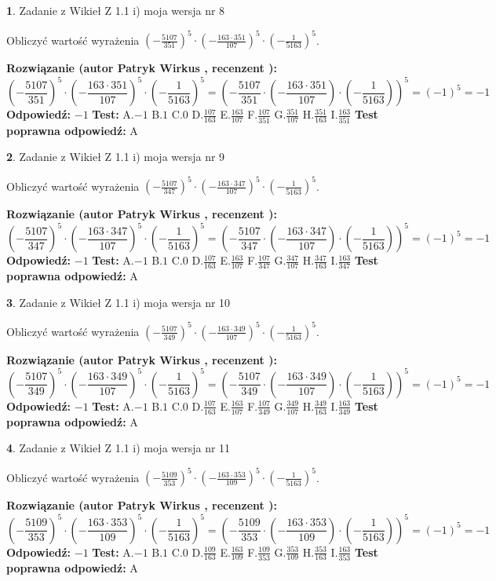 \documentclass[12pt, a4paper]{article}
\theoremstyle{definition} %
\newtheorem{zad}{}
\newcommand{\zadStart}[1]{\begin{zad}#1\newline}
\newcommand{\zadStop}{\end{zad}}
\newcommand{\rozwStart}[2]{\noindent \textbf{Rozwiązanie (autor #1 , recenzent #2): }\newline}
\newcommand{\rozwStop}{\newline}
\newcommand{\odpStart}{\noindent \textbf{Odpowiedź:}\newline}
\newcommand{\odpStop}{\newline}
\newcommand{\testStart}{\noindent \textbf{Test:}\newline}
\newcommand{\testStop}{\newline}
\newcommand{\kluczStart}{\noindent \textbf{Test poprawna odpowiedź:}\newline}
\newcommand{\kluczStop}{\newline}
\begin{document}
\zadStart{Zadanie z Wikieł Z 1.1 i) moja wersja nr 8}

Obliczyć wartość wyrażenia $(-\frac{5107}{351})^{5} \cdot (-\frac{163 \cdot 351}{107})^{5} \cdot (-\frac{1}{5163})^{5}$.
\zadStop
\rozwStart{Patryk Wirkus}{}
$$(-\frac{5107}{351})^{5} \cdot (-\frac{163 \cdot 351}{107})^{5} \cdot (-\frac{1}{5163})^{5} = (-\frac{5107}{351} \cdot (-\frac{163 \cdot 351}{107}) \cdot (-\frac{1}{5163}))^{5} = (-1)^{5} = -1$$
\rozwStop
\odpStart
$-1$
\odpStop
\testStart
A.$-1$ B.$1$ C.$0$ D.$\frac{107}{163}$ E.$\frac{163}{107}$
F.$\frac{107}{351}$ G.$\frac{351}{107}$
H.$\frac{351}{163}$
I.$\frac{163}{351}$
\testStop
\kluczStart
A
\kluczStop



\zadStart{Zadanie z Wikieł Z 1.1 i) moja wersja nr 9}

Obliczyć wartość wyrażenia $(-\frac{5107}{347})^{5} \cdot (-\frac{163 \cdot 347}{107})^{5} \cdot (-\frac{1}{5163})^{5}$.
\zadStop
\rozwStart{Patryk Wirkus}{}
$$(-\frac{5107}{347})^{5} \cdot (-\frac{163 \cdot 347}{107})^{5} \cdot (-\frac{1}{5163})^{5} = (-\frac{5107}{347} \cdot (-\frac{163 \cdot 347}{107}) \cdot (-\frac{1}{5163}))^{5} = (-1)^{5} = -1$$
\rozwStop
\odpStart
$-1$
\odpStop
\testStart
A.$-1$ B.$1$ C.$0$ D.$\frac{107}{163}$ E.$\frac{163}{107}$
F.$\frac{107}{347}$ G.$\frac{347}{107}$
H.$\frac{347}{163}$
I.$\frac{163}{347}$
\testStop
\kluczStart
A
\kluczStop



\zadStart{Zadanie z Wikieł Z 1.1 i) moja wersja nr 10}

Obliczyć wartość wyrażenia $(-\frac{5107}{349})^{5} \cdot (-\frac{163 \cdot 349}{107})^{5} \cdot (-\frac{1}{5163})^{5}$.
\zadStop
\rozwStart{Patryk Wirkus}{}
$$(-\frac{5107}{349})^{5} \cdot (-\frac{163 \cdot 349}{107})^{5} \cdot (-\frac{1}{5163})^{5} = (-\frac{5107}{349} \cdot (-\frac{163 \cdot 349}{107}) \cdot (-\frac{1}{5163}))^{5} = (-1)^{5} = -1$$
\rozwStop
\odpStart
$-1$
\odpStop
\testStart
A.$-1$ B.$1$ C.$0$ D.$\frac{107}{163}$ E.$\frac{163}{107}$
F.$\frac{107}{349}$ G.$\frac{349}{107}$
H.$\frac{349}{163}$
I.$\frac{163}{349}$
\testStop
\kluczStart
A
\kluczStop



\zadStart{Zadanie z Wikieł Z 1.1 i) moja wersja nr 11}

Obliczyć wartość wyrażenia $(-\frac{5109}{353})^{5} \cdot (-\frac{163 \cdot 353}{109})^{5} \cdot (-\frac{1}{5163})^{5}$.
\zadStop
\rozwStart{Patryk Wirkus}{}
$$(-\frac{5109}{353})^{5} \cdot (-\frac{163 \cdot 353}{109})^{5} \cdot (-\frac{1}{5163})^{5} = (-\frac{5109}{353} \cdot (-\frac{163 \cdot 353}{109}) \cdot (-\frac{1}{5163}))^{5} = (-1)^{5} = -1$$
\rozwStop
\odpStart
$-1$
\odpStop
\testStart
A.$-1$ B.$1$ C.$0$ D.$\frac{109}{163}$ E.$\frac{163}{109}$
F.$\frac{109}{353}$ G.$\frac{353}{109}$
H.$\frac{353}{163}$
I.$\frac{163}{353}$
\testStop
\kluczStart
A
\kluczStop
\end{document}
